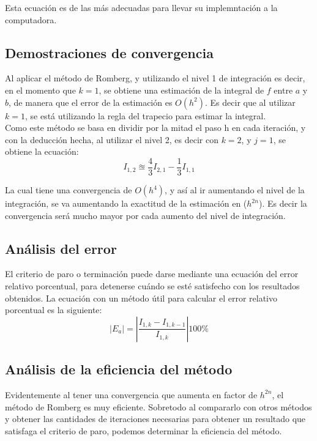 \documentclass[journal,transmag]{IEEEtran}
\theoremstyle{mytheoremstyle}
\theoremstyle{mytheoremstyle}
\theoremstyle{myproblemstyle}
\begin{document}
Esta ecuación es de las más adecuadas para llevar su implemntación a la computadora.






\subsection{Demostraciones de convergencia}
    Al aplicar el método de Romberg, y utilizando el nivel 1 de integración es decir, en el momento que $k=1$,
    se obtiene una estimación de la integral de $f$ entre $a$ y $b$, de manera que el error de la estimación es $O(h^2)$.
    Es decir que al utilizar $k=1$, se está utilizando la regla del trapecio para estimar la integral. \\

    Como este método se basa en dividir por la mitad el paso h en cada iteración, y con la deducción hecha, al utilizar el nivel 2, es decir con $k=2$, y $j=1$,
    se obtiene la ecuación:
    \begin{equation}
        I_{1,2} \approxeq \frac{4}{3}I_{2, 1}-\frac{1}{3}I_{1,1}
    \end{equation}

    La cual tiene una convergencia de $O(h^4)$, y así al ir aumentando el nivel de la integración, se va aumentando la exactitud de la estimación en ($h^{2n}$).
    Es decir la convergencia será mucho mayor por cada aumento del nivel de integración. \\
\subsection{Análisis del error}
    El criterio de paro o terminación puede darse mediante una ecuación del error relativo porcentual, para detenerse cuándo se esté satisfecho con los resultados obtenidos.
    La ecuación con un método útil para calcular el error relativo porcentual es la siguiente:
    \begin{equation}
        |E_a| = |\frac{I_{1,k}-I_{1,k-1}}{I_{1,k}}|100\%
    \end{equation}


\subsection{Análisis de la eficiencia del método}
    Evidentemente al tener una convergencia que aumenta en factor de $h^{2n}$, el método de Romberg es muy eficiente. 
    Sobretodo al compararlo con otros métodos y obtener las cantidades de iteraciones necesarias para obtener un resultado que satisfaga
    el criterio de paro, podemos determinar la eficiencia del método.  \\
\end{document}
